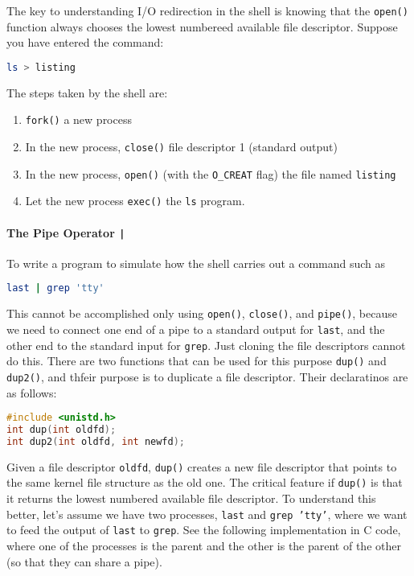 \documentclass{article}
\newcommand{\code}[1]{\texttt{#1}}
\begin{document}
The key to understanding I/O redirection in the shell is knowing that the \code{open()} function always chooses the lowest numbereed available file descriptor. Suppose you have entered the command: 

\begin{lstlisting}[language=bash]
ls > listing
\end{lstlisting}

The steps taken by the shell are:

\begin{enumerate}
    \item \code{fork()} a new process
    \item In the new process, \code{close()} file descriptor 1 (standard output)
    \item In the new process, \code{open()} (with the \code{O\_CREAT} flag) the file named \code{listing}
    \item Let the new process \code{exec()} the \code{ls} program. 
\end{enumerate}

\paragraph{The Pipe Operator \code{|}}

To write a program to simulate how the shell carries out a command such as 

\begin{lstlisting}[language=bash]
last | grep 'tty'
\end{lstlisting}

This cannot be accomplished only using \code{open()}, \code{close()}, and \code{pipe()}, because we need to connect one end of a pipe to a standard output for \code{last}, and the other end to the standard input for \code{grep}. Just cloning the file descriptors cannot do this. There are two functions that can be used for this purpose \code{dup()} and \code{dup2()}, and thfeir purpose is to duplicate a file descriptor. Their declaratinos are as follows: 

\begin{lstlisting}[language=C]
#include <unistd.h>
int dup(int oldfd);
int dup2(int oldfd, int newfd);
\end{lstlisting}

Given a file descriptor \code{oldfd}, \code{dup()} creates a new file descriptor that points to the same kernel file structure as the old one. The critical feature if \code{dup()} is that it returns the lowest numbered available file descriptor. To understand this better, let's assume we have two processes, \code{last} and \code{grep 'tty'}, where we want to feed the output of \code{last} to \code{grep}. See the following implementation in C code, where one of the processes is the parent and the other is the parent of the other (so that they can share a pipe). 
\end{document}
